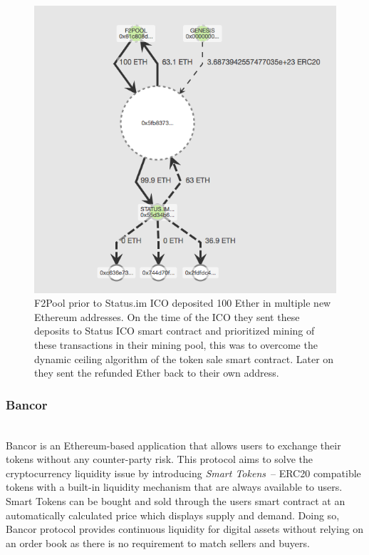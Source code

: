 

\begin{figure}[h]
\centering
\includegraphics[width=0.5\linewidth]{figures/F2Pool_transactions_to_StatusICO_and_Refunds.png}
\caption{F2Pool prior to Status.im ICO deposited 100 Ether in multiple new Ethereum addresses. On the time of the ICO they sent these deposits to Status ICO smart contract and prioritized mining of these transactions in their mining pool, this was to overcome the dynamic ceiling algorithm of the token sale smart contract. Later on they sent the refunded Ether back to their own address.\label{fig:f2poolfrontrun}}
\end{figure}



\subsubsection{Bancor} \hfill\\
\noindent Bancor is an Ethereum-based application that allows users to exchange their tokens without any counter-party risk. This protocol aims to solve the cryptocurrency liquidity issue by introducing \textit{Smart Tokens}~\cite{hertzog2017bancor}-- ERC20 compatible tokens with a built-in liquidity mechanism that are always available to users. Smart Tokens can be bought and sold through the users smart contract at an automatically calculated price which displays supply and demand. Doing so, Bancor protocol provides continuous liquidity for digital assets without relying on an order book as there is no requirement to match sellers and buyers.


